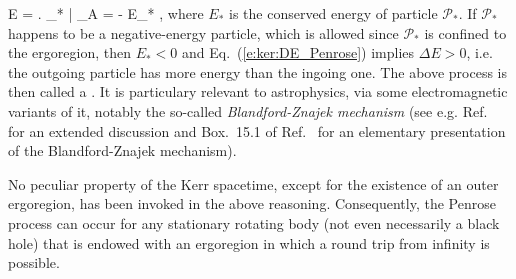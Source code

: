 \be \label{e:ker:DE_Penrose}
    \Delta E =   \left. \w{\xi} \cdot {}_* \right| _{A} = - E_* ,
\ee
where $E_*$ is the conserved energy of particle $\mathscr{P}_*$.
If $\mathscr{P}_*$ happens to be a negative-energy particle, which is allowed since
$\mathscr{P}_*$ is confined to the ergoregion, then $E_* < 0$ and
Eq.~(\ref{e:ker:DE_Penrose}) implies $\Delta E > 0$,
i.e. the outgoing particle has more energy
than the ingoing one. The above process is then called a
.
It is particulary relevant to astrophysics, via some electromagnetic variants of it,
notably the so-called
\emph{Blandford-Znajek mechanism}
(see e.g. Ref.~\cite{LasotGATN14} for an extended discussion and Box.~15.1
of Ref.~\cite{Hartl03} for an
elementary presentation of the Blandford-Znajek mechanism).

\begin{remark}
No peculiar property of the Kerr spacetime, except for the existence of an outer
ergoregion, has been invoked in the above reasoning. Consequently, the Penrose process
can occur for any stationary rotating body (not even necessarily a black hole) that
is endowed with an ergoregion in which a round trip from infinity is possible.
\end{remark}

